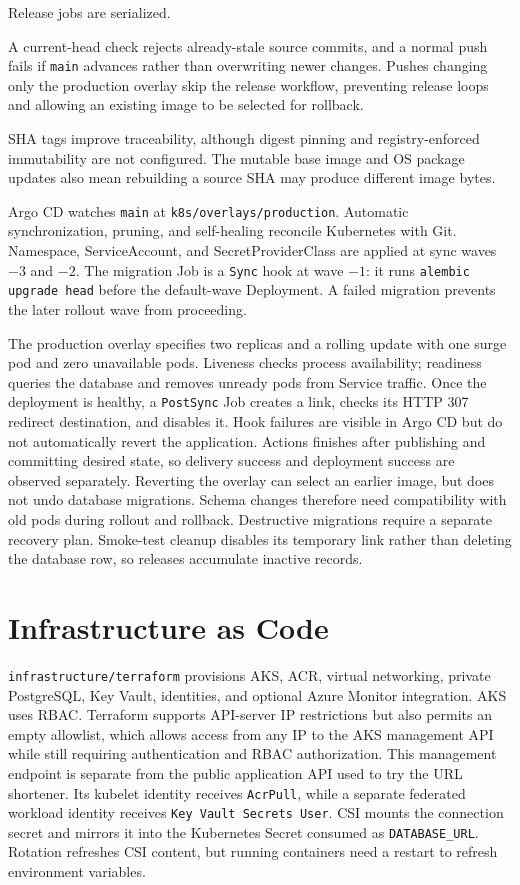 \documentclass[10pt,a4paper]{article}
\newcommand{\file}[1]{\texttt{\nolinkurl{#1}}}
\begin{document}
Release jobs are serialized. 

A current-head check rejects already-stale source commits, and a normal push fails if \texttt{main} advances rather than overwriting newer changes. 
Pushes changing only the production overlay skip the release workflow, preventing release loops and allowing an existing image to be selected for rollback. 

SHA tags improve traceability, although digest pinning and registry-enforced immutability are not configured.
The mutable base image and OS package updates also mean rebuilding a source SHA may produce different image bytes.

Argo CD watches \texttt{main} at \file{k8s/overlays/production}. Automatic synchronization, pruning, and self-healing reconcile Kubernetes with Git. Namespace, ServiceAccount, and SecretProviderClass are applied at sync waves $-3$ and $-2$. The migration Job is a \texttt{Sync} hook at wave $-1$: it runs \texttt{alembic upgrade head} before the default-wave Deployment. A failed migration prevents the later rollout wave from proceeding.

The production overlay specifies two replicas and a rolling update with one surge pod and zero unavailable pods.
Liveness checks process availability; readiness queries the database and removes unready pods from Service traffic. 
Once the deployment is healthy, a \texttt{PostSync} Job creates a link, checks its HTTP 307 redirect destination, and disables it. 
Hook failures are visible in Argo CD but do not automatically revert the application. 
Actions finishes after publishing and committing desired state, so delivery success and deployment success are observed separately.
Reverting the overlay can select an earlier image, but does not undo database migrations. Schema changes therefore need compatibility with old pods during rollout and rollback. Destructive migrations require a separate recovery plan. Smoke-test cleanup disables its temporary link rather than deleting the database row, so releases accumulate inactive records.

\section{Infrastructure as Code}
\file{infrastructure/terraform} provisions AKS, ACR, virtual networking, private PostgreSQL, Key Vault, identities, and optional Azure Monitor integration. 
AKS uses RBAC. Terraform supports API-server IP restrictions but also permits an empty allowlist, which allows access from any IP to the AKS management API while still requiring authentication and RBAC authorization. This management endpoint is separate from the public application API used to try the URL shortener.
Its kubelet identity receives \texttt{AcrPull}, while a separate federated workload identity receives \texttt{Key Vault Secrets User}.
CSI mounts the connection secret and mirrors it into the Kubernetes Secret consumed as \file{DATABASE_URL}. 
Rotation refreshes CSI content, but running containers need a restart to refresh environment variables.
\end{document}
